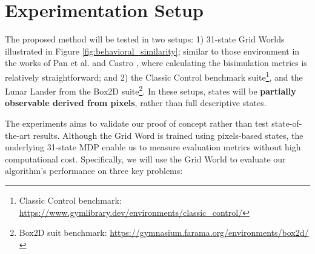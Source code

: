 \begin{algorithm}
\begin{algorithmic}[1]
        

    \EndIf
\EndFor
\end{algorithmic}
\end{algorithm}

\section{Experimentation Setup}

The proposed method will be tested in two setups: 1) 31-state Grid Worlds illustrated in Figure \ref{fig:behavioral_similarity}; similar to those environment in the works of Pan et al. \cite{pan2022understanding} and Castro \cite{castro2020scalable}, where calculating the bisimulation metrics is relatively straightforward; and 2) the Classic Control benchmark suite\footnote{Classic Control benchmark: \href{https://www.gymlibrary.dev/environments/classic_control/}{https://www.gymlibrary.dev/environments/classic\_control/}}, and the Lunar Lander from the Box2D suite\footnote{Box2D suit benchmark: \href{https://gymnasium.farama.org/environments/box2d/}{https://gymnasium.farama.org/environments/box2d/}}. In these setups, states will be \textbf{partially observable derived from pixels}, rather than full descriptive states.

The experiments aims to validate our proof of concept rather than test state-of-the-art results. Although the Grid Word is trained using pixels-based states, the underlying 31-state MDP enable us to measure evaluation metrics without high computational cost. Specifically, we will use the Grid World to evaluate our algorithm's performance on three key problems:

